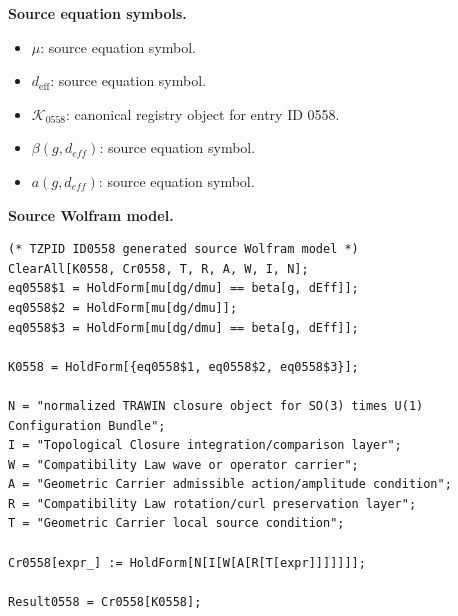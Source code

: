 \begin{minipage}[t]{0.49\linewidth}
\begingroup
\small
\raggedright
\textbf{Source equation symbols.}\par
\begin{itemize}[leftmargin=1.35em,itemsep=1pt,topsep=1pt,parsep=0pt]
    \item $\mu$: source equation symbol.
    \item $d_{\mathrm{eff}}$: source equation symbol.
    \item $\mathcal{K}_{0558}$: canonical registry object for entry ID 0558.
    \item $\beta(g,d_{eff})$: source equation symbol.
    \item $a(g,d_{eff})$: source equation symbol.
\end{itemize}
\endgroup
\end{minipage}\hfill
\begin{minipage}[t]{0.47\linewidth}
\begingroup
\scriptsize
\raggedright
\textbf{Source Wolfram model.}\par
\begin{Verbatim}[fontsize=\tiny,breaklines=true,breakanywhere=true]
(* TZPID ID0558 generated source Wolfram model *)
ClearAll[K0558, Cr0558, T, R, A, W, I, N];
eq0558$1 = HoldForm[mu[dg/dmu] == beta[g, dEff]];
eq0558$2 = HoldForm[mu[dg/dmu]];
eq0558$3 = HoldForm[mu[dg/dmu] == beta[g, dEff]];

K0558 = HoldForm[{eq0558$1, eq0558$2, eq0558$3}];

N = "normalized TRAWIN closure object for SO(3) times U(1) Configuration Bundle";
I = "Topological Closure integration/comparison layer";
W = "Compatibility Law wave or operator carrier";
A = "Geometric Carrier admissible action/amplitude condition";
R = "Compatibility Law rotation/curl preservation layer";
T = "Geometric Carrier local source condition";

Cr0558[expr_] := HoldForm[N[I[W[A[R[T[expr]]]]]]];

Result0558 = Cr0558[K0558];
\end{Verbatim}
\endgroup
\end{minipage}


